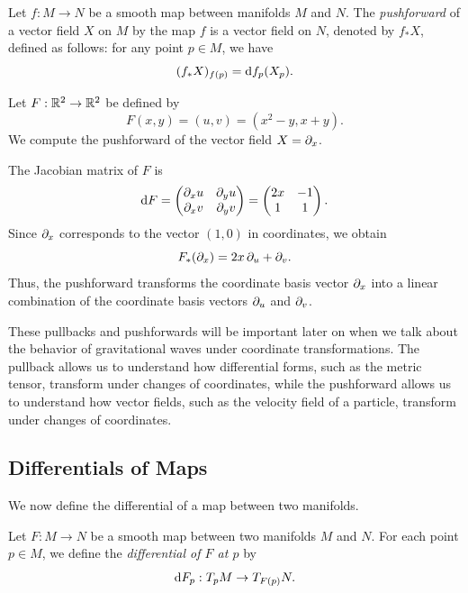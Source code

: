 \begin{definition}
  Let $f : M \to N$ be a smooth map between manifolds $M$ and $N$. The \emph{pushforward} of a vector field $X$ on $M$ by the map $f$ is a vector field on $N$, denoted by $f_*X$, defined as follows: for any point $p \in M$, we have
  \[%
    (f_*X)_{f(p)} = \df_p(X_p)
  .\]%
\end{definition}

\begin{example}
  Let $F : \mathbb{R}^2 \rightarrow \mathbb{R}^2$ be defined by
  \[%
    F(x,y) = (u,v) = (x^2 - y, x + y)
  .\]%
  We compute the pushforward of the vector field $X = \pd{x}$.

  The Jacobian matrix of $F$ is
  \[%
    \dF = \begin{pmatrix}
      \pd{x} u & \pd{y} u \\
      \pd{x} v & \pd{y} v \\
    \end{pmatrix}
    = \begin{pmatrix}
      2x & -1 \\
      1 & 1 \\
    \end{pmatrix}
  .\]%
  Since $\pd{x}$ corresponds to the vector $(1,0)$ in coordinates, we obtain
  \[%
    F_*(\pd{x}) = 2x \pd{u} + \pd{v}
  .\]%
  Thus, the pushforward transforms the coordinate basis vector $\pd{x}$ into a linear combination of the coordinate basis vectors $\pd{u}$ and $\pd{v}$.
\end{example}

\begin{note}
  These pullbacks and pushforwards will be important later on when we talk about the behavior of gravitational waves under coordinate transformations. The pullback allows us to understand how differential forms, such as the metric tensor, transform under changes of coordinates, while the pushforward allows us to understand how vector fields, such as the velocity field of a particle, transform under changes of coordinates.
\end{note}


\subsection{Differentials of Maps} We now define the differential of a map between two manifolds.

\begin{definition}
  Let $F : M \to N$ be a smooth map between two manifolds $M$ and $N$. For each point $p \in M$, we define the \emph{differential of $F$ at $p$} by
  \[%
    \dF_p : T_pM \to T_{F(p)}N
  .\]%
\end{definition}

